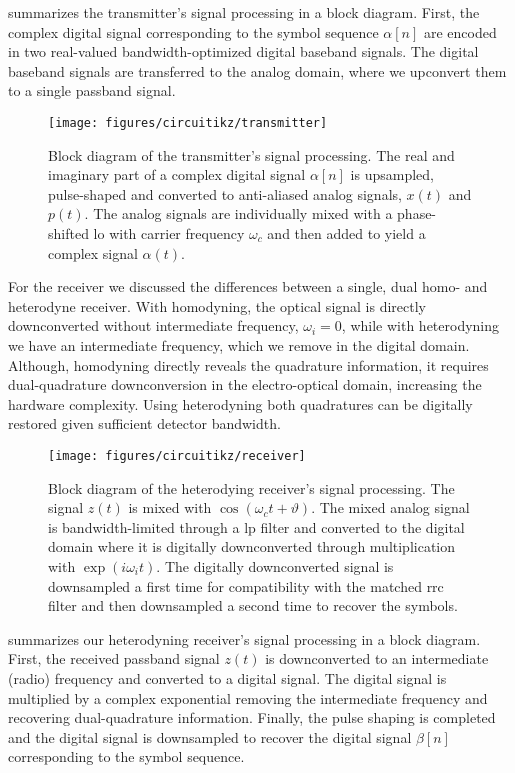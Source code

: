  summarizes the transmitter's signal processing in a block diagram.
First, the complex digital signal corresponding to the symbol sequence $\alpha[n]$ are encoded in two real-valued bandwidth-optimized digital baseband signals.
The digital baseband signals are transferred to the analog domain, where we upconvert them to a single passband signal.
\begin{figure}[htb]
	\centering
	\texttt{[image: figures/circuitikz/transmitter]}
	\caption{Block diagram of the transmitter's signal processing. The real and imaginary part of a complex digital signal $\alpha[n]$ is upsampled, pulse-shaped and converted to anti-aliased analog signals, $x(t)$ and $p(t)$. The analog signals are individually mixed with a phase-shifted \gls{lo} with carrier frequency $\omega_c$ and then added to yield a complex signal $\alpha(t)$.}\label{fig:transmitter_signal_processing}
\end{figure}
For the receiver we discussed the differences between a single, dual homo- and heterodyne receiver.
With homodyning, the optical signal is directly downconverted without intermediate frequency, $\omega_i=0$, while with heterodyning we have an intermediate frequency, which we remove in the digital domain.
Although, homodyning directly reveals the quadrature information, it requires dual-quadrature downconversion in the electro-optical domain, increasing the hardware complexity.
Using heterodyning both quadratures can be digitally restored given sufficient detector bandwidth.
\begin{figure}[htb]
	\centering
	\texttt{[image: figures/circuitikz/receiver]}
	\caption{Block diagram of the heterodying receiver's signal processing. The signal $z(t)$ is mixed with $\cos(\omega_ct+\vartheta)$. The mixed analog signal is bandwidth-limited through a \gls{lp} filter and converted to the digital domain where it is digitally downconverted through multiplication with $\exp(i\omega_it)$. The digitally downconverted signal is downsampled a first time for compatibility with the matched \gls{rrc} filter and then downsampled a second time to recover the symbols.}\label{fig:receiver_signal_processing}
\end{figure}
 summarizes our heterodyning receiver's signal processing in a block diagram.
First, the received passband signal $z(t)$ is downconverted to an intermediate (radio) frequency and converted to a digital signal.
The digital signal is multiplied by a complex exponential removing the intermediate frequency and recovering dual-quadrature information.
Finally, the pulse shaping is completed and the digital signal is downsampled to recover the digital signal $\beta[n]$ corresponding to the symbol sequence.

